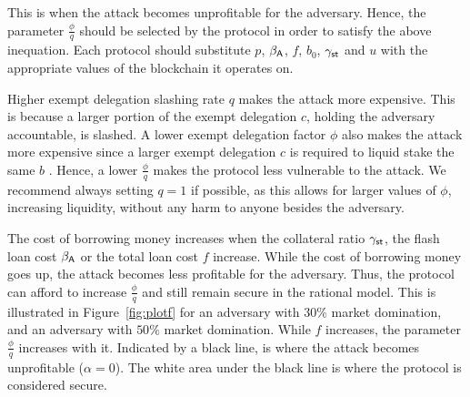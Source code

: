This is when the attack becomes unprofitable for the adversary.
Hence, the parameter $\frac{\phi}{q}$ should be selected by the protocol in order
to satisfy the above inequation.
Each protocol should substitute $p$, $\beta_{\textsf{A}}$, $f$, $b_0$,
$\gamma_{\textsf{st}}$ and $u$ with the appropriate values of the blockchain it operates on.

Higher exempt delegation slashing rate $q$ makes the attack more expensive. This
is because a larger portion of the exempt delegation $c$, holding the adversary accountable,
is slashed. A lower exempt delegation factor $\phi$ also makes the attack more expensive
since a larger exempt delegation $c$ is required to liquid stake the same $b$ \asset.
Hence, a lower $\frac{\phi}{q}$ makes the protocol less vulnerable to the attack.
We recommend always setting $q = 1$ if possible, as this allows for
larger values of $\phi$, increasing liquidity, without any harm to anyone
besides the adversary.

The cost of borrowing money increases when the collateral ratio
$\gamma_{\textsf{st}}$, the flash loan cost $\beta_{\textsf{A}}$ or the total loan cost $f$
increase. While the cost of borrowing money goes up, the attack becomes less profitable
for the adversary. Thus, the protocol can afford to increase $\frac{\phi}{q}$
and still remain secure in the rational model. This is illustrated in Figure~\ref{fig:plotf} for
an adversary with $30\%$ market domination, and an adversary with $50\%$ market domination.
While $f$ increases, the parameter $\frac{\phi}{q}$ increases with it.
Indicated by a black line, is where the attack becomes unprofitable ($\alpha = 0$).
The white area under the black line is where the protocol is considered secure.


